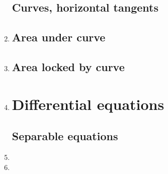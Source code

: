 \documentclass{article}
\begin{document}
\begin{enumerate}
\subsection{Curves, horizontal tangents}
\item 


\subsection{Area under curve}
\item 
\subsection{Area locked by curve}
\item 


\section{Differential equations}
\subsection{Separable equations}
\item 

\item 



\end{enumerate}
\end{document}
